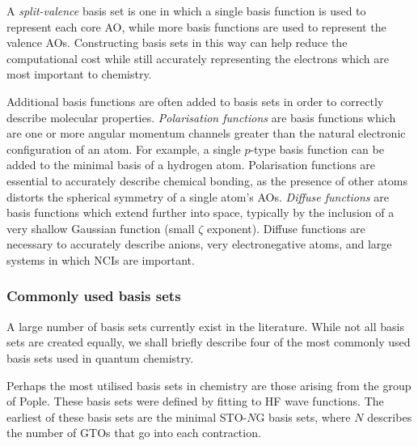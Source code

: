 A \emph{split-valence} basis set is one in which a single basis function is used
to represent each core AO, while more basis functions are used to represent the
valence AOs. Constructing basis sets in this way can help reduce the
computational cost while still accurately representing the electrons which are
most important to chemistry.

Additional basis functions are often added to basis sets in order to correctly
describe molecular properties. \emph{Polarisation functions} are basis functions
which are one or more angular momentum channels greater than the natural
electronic configuration of an atom. For example, a single $p$-type basis
function can be added to the minimal basis of a hydrogen atom. Polarisation
functions are essential to accurately describe chemical bonding, as the presence
of other atoms distorts the spherical symmetry of a single atom's
AOs.\cite{Szabo1996} \emph{Diffuse functions} are basis functions which extend
further into space, typically by the inclusion of a very shallow Gaussian
function (small $\zeta$ exponent). Diffuse functions are necessary to accurately
describe anions, very electronegative atoms, and large systems in which NCIs are
important.

\subsubsection{Commonly used basis sets}

A large number of basis sets currently exist in the literature.\cite{Jensen2012}
While not all basis sets are created equally, we shall briefly describe four of
the most commonly used basis sets used in quantum chemistry. 

\vspace{3mm}
\vspace{1mm}

Perhaps the most utilised basis sets in chemistry are those arising from the
group of Pople.\cite{Hehre1969} These basis sets were defined by fitting to HF
wave functions. The earliest of these basis sets are the minimal STO-$N$G basis
sets, where $N$ describes the number of GTOs that go into each contraction.

